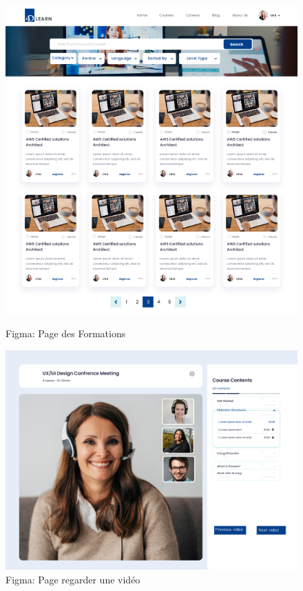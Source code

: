 \begin{figure}[H]
    \centering
    \begin{minipage}{0.45\textwidth}
        \centering
        \includegraphics[width=\textwidth]{Figures/explorer.PNG}
        \caption{Figma: Page des Formations}

    \end{minipage}
    \hfill
    \begin{minipage}{0.45\textwidth}
        \centering
        \includegraphics[width=\textwidth]{Figures/watchVideo.PNG}
        \caption{Figma: Page regarder une vidéo }
        
    \end{minipage}
\end{figure}


